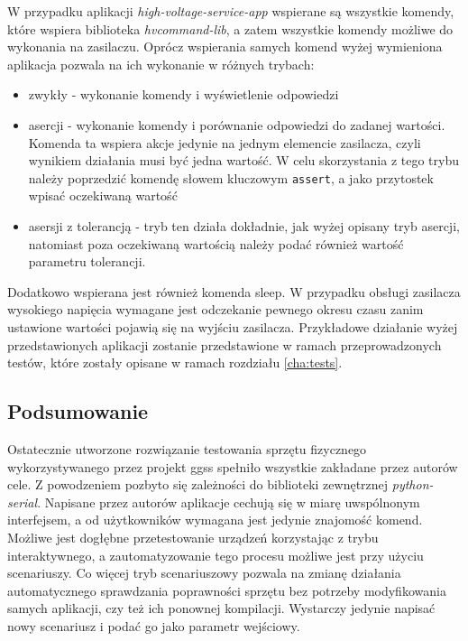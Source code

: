 W przypadku aplikacji \emph{high-voltage-service-app} wspierane są wszystkie komendy, które wspiera biblioteka \emph{hvcommand-lib}, a zatem wszystkie komendy możliwe do wykonania na zasilaczu. Oprócz wspierania samych komend wyżej wymieniona aplikacja pozwala na ich wykonanie w różnych trybach:
\begin{itemize}
    \item zwykły - wykonanie komendy i wyświetlenie odpowiedzi
    \item asercji - wykonanie komendy i porównanie odpowiedzi do zadanej wartości. Komenda ta wspiera akcje jedynie na jednym elemencie zasilacza, czyli wynikiem działania musi być jedna wartość. W celu skorzystania z tego trybu należy poprzedzić komendę słowem kluczowym \lstinline{assert}, a jako przytostek wpisać oczekiwaną wartość
    \item asersji z tolerancją - tryb ten działa dokładnie, jak wyżej opisany tryb asercji, natomiast poza oczekiwaną wartością należy podać również wartość parametru tolerancji.
\end{itemize}
Dodatkowo wspierana jest również komenda sleep. W przypadku obsługi zasilacza wysokiego napięcia wymagane jest odczekanie pewnego okresu czasu zanim ustawione wartości pojawią się na wyjściu zasilacza. Przykładowe działanie wyżej przedstawionych aplikacji zostanie przedstawione w ramach przeprowadzonych testów, które zostały opisane w ramach rozdziału \ref{cha:tests}.


\subsection{Podsumowanie}

Ostatecznie utworzone rozwiązanie testowania sprzętu fizycznego wykorzystywanego przez projekt ggss spełniło wszystkie zakładane przez autorów cele. Z powodzeniem pozbyto się zależności do biblioteki zewnętrznej \emph{python-serial}. Napisane przez autorów aplikacje cechują się w miarę uwspólnonym interfejsem, a od użytkowników wymagana jest jedynie znajomość komend. Możliwe jest dogłębne przetestowanie urządzeń korzystając z trybu interaktywnego, a zautomatyzowanie tego procesu możliwe jest przy użyciu scenariuszy. Co więcej tryb scenariuszowy pozwala na zmianę działania automatycznego sprawdzania poprawności sprzętu bez potrzeby modyfikowania samych aplikacji, czy też ich ponownej kompilacji. Wystarczy jedynie napisać nowy scenariusz i podać go jako parametr wejściowy.